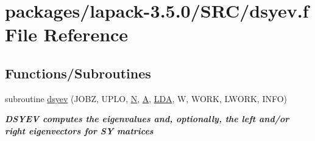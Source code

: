 \hypertarget{dsyev_8f}{}\section{packages/lapack-\/3.5.0/\+S\+R\+C/dsyev.f File Reference}
\label{dsyev_8f}
\subsection*{Functions/\+Subroutines}
\begin{DoxyCompactItemize}
\item 
subroutine \hyperlink{group__doubleSYeigen_ga442c43fca5493590f8f26cf42fed4044}{dsyev} (J\+O\+B\+Z, U\+P\+L\+O, \hyperlink{polmisc_8c_a0240ac851181b84ac374872dc5434ee4}{N}, \hyperlink{classA}{A}, \hyperlink{example__user_8c_ae946da542ce0db94dced19b2ecefd1aa}{L\+D\+A}, W, W\+O\+R\+K, L\+W\+O\+R\+K, I\+N\+F\+O)
\begin{DoxyCompactList}\small\item\em {\bfseries  D\+S\+Y\+E\+V computes the eigenvalues and, optionally, the left and/or right eigenvectors for S\+Y matrices} \end{DoxyCompactList}\end{DoxyCompactItemize}
